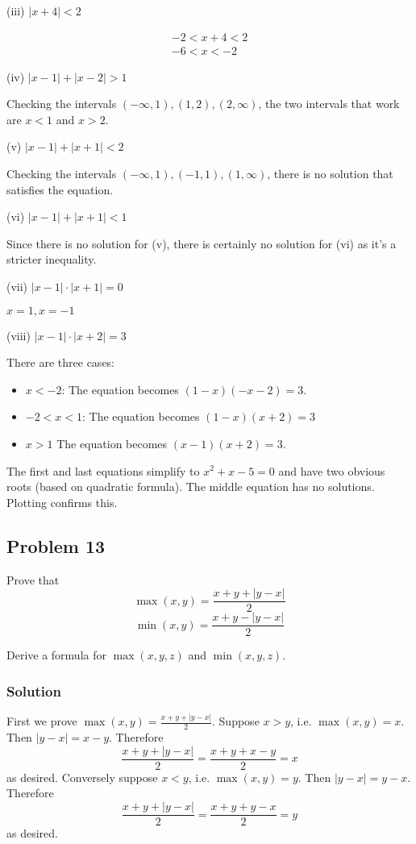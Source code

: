 (iii) $|x+4|<2$

\begin{align*}
    -2<x+4<2\\
    -6<x<-2
\end{align*}

\vs

(iv) $|x-1|+|x-2|>1$

Checking the intervals $(-\infty, 1), (1, 2), (2, \infty)$, the two intervals that work are $x<1$ and $x>2$.

\vs

(v) $|x-1|+|x+1|<2$

Checking the intervals $(-\infty, 1), (-1, 1), (1, \infty)$, there is no solution that satisfies the equation.

\vs

(vi) $|x-1|+|x+1|<1$

Since there is no solution for (v), there is certainly no solution for (vi) as it's a stricter inequality.

\vs

(vii) $|x-1|\cdot|x+1|=0$

$x=1, x=-1$

\vs

(viii) $|x-1|\cdot|x+2|=3$

There are three cases:
\begin{itemize}
    \item $x<-2$: The equation becomes $(1-x)(-x-2)=3$.
    \item $-2<x<1$: The equation becomes $(1-x)(x+2)=3$
    \item $x>1$ The equation becomes $(x-1)(x+2)=3$.
\end{itemize}

The first and last equations simplify to $x^2+x-5=0$ and have two obvious roots (based on quadratic formula). The middle equation has no solutions. Plotting confirms this.

\subsection*{Problem 13}
Prove that
\[\max(x,y)=\frac{x+y+|y-x|}{2}\]
\[\min(x,y)=\frac{x+y-|y-x|}{2}\]

Derive a formula for $\max(x,y,z)$ and $\min(x,y,z)$.

\subsubsection*{Solution}
First we prove $\max(x,y)=\frac{x+y+|y-x|}{2}$. Suppose $x>y$, i.e. $\max(x,y)=x$. Then $|y-x|=x-y$. Therefore
\[\frac{x+y+|y-x|}{2}=\frac{x+y+x-y}{2}=x\]
as desired. Conversely suppose $x<y$, i.e. $\max(x,y)=y$. Then $|y-x|=y-x$. Therefore
\[\frac{x+y+|y-x|}{2}=\frac{x+y+y-x}{2}=y\]
as desired.


